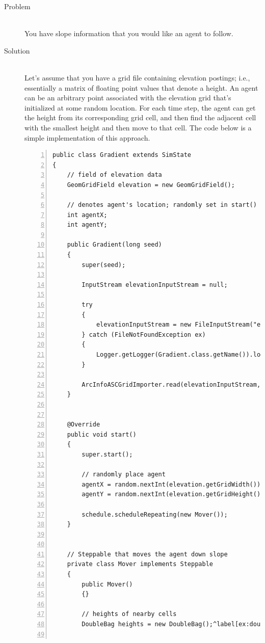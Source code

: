 \documentclass[twoside,10pt]{book}
\begin{document}
\begin{description}
\item[Problem]~\\
You have slope information that you would like an agent to follow.

\item[Solution]~\\
  Let's assume that you have a grid file containing elevation postings;
  i.e., essentially a matrix of floating point values that denote a
  height.  An agent can be an arbitrary point associated with the
  elevation grid that's initialized at some random location.  For each
  time step, the agent can get the height from its corresponding grid
  cell, and then find the adjacent cell with the smallest height and
  then move to that cell.  The code below is a simple implementation
  of this approach.

\begin{Verbatim}[frame=lines,framesep=5mm,numbers=left,commandchars=^\[\]]
public class Gradient extends SimState
{
    // field of elevation data
    GeomGridField elevation = new GeomGridField();

    // denotes agent's location; randomly set in start()
    int agentX;
    int agentY;

    public Gradient(long seed)
    {
        super(seed);

        InputStream elevationInputStream = null;

        try
        {
            elevationInputStream = new FileInputStream("elevations.asc");
        } catch (FileNotFoundException ex)
        {
            Logger.getLogger(Gradient.class.getName()).log(Level.SEVERE, null, ex);
        }

        ArcInfoASCGridImporter.read(elevationInputStream, GridDataType.DOUBLE, elevation);
    }


    @Override
    public void start()
    {
        super.start();

        // randomly place agent
        agentX = random.nextInt(elevation.getGridWidth());
        agentY = random.nextInt(elevation.getGridHeight());

        schedule.scheduleRepeating(new Mover());
    }


    // Steppable that moves the agent down slope
    private class Mover implements Steppable
    {
        public Mover()
        {}

        // heights of nearby cells
        DoubleBag heights = new DoubleBag();^label[ex:doublebag]


\end{Verbatim}
\end{description}
\end{document}
